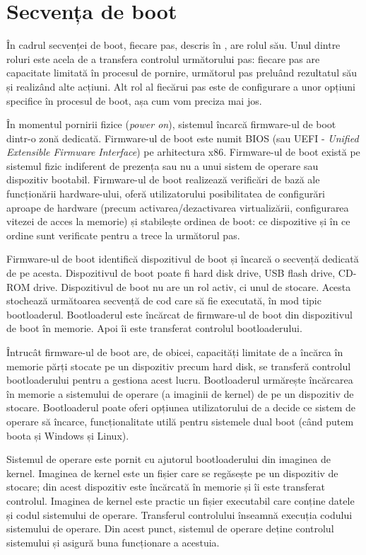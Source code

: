 \section{Secvența de boot}
\label{sec:boot:sequence}

În cadrul secvenței de boot, fiecare pas, descris în , are rolul său.
Unul dintre roluri este acela de a transfera controlul următorului pas: fiecare pas are capacitate limitată în procesul de pornire, următorul pas preluând rezultatul său și realizând alte acțiuni.
Alt rol al fiecărui pas este de configurare a unor opțiuni specifice în procesul de boot, așa cum vom preciza mai jos.

În momentul pornirii fizice (\textit{power on}), sistemul încarcă firmware-ul de boot dintr-o zonă dedicată.
Firmware-ul de boot este numit BIOS (sau UEFI  - \textit{Unified Extensible Firmware Interface}) pe arhitectura x86.
Firmware-ul de boot există pe sistemul fizic indiferent de prezența sau nu a unui sistem de operare sau dispozitiv bootabil.
Firmware-ul de boot realizează verificări de bază ale funcționării hardware-ului, oferă utilizatorului posibilitatea de configurări aproape de hardware (precum activarea/dezactivarea virtualizării, configurarea vitezei de acces la memorie) și stabilește ordinea de boot: ce dispozitive și în ce ordine sunt verificate pentru a trece la următorul pas.

Firmware-ul de boot identifică dispozitivul de boot și încarcă o secvență dedicată de pe acesta.
Dispozitivul de boot poate fi hard disk drive, USB flash drive, CD-ROM drive.
Dispozitivul de boot nu are un rol activ, ci unul de stocare.
Acesta stochează următoarea secvență de cod care să fie executată, în mod tipic bootloaderul.
Bootloaderul este încărcat de firmware-ul de boot din dispozitivul de boot în memorie.
Apoi îi este transferat controlul bootloaderului.

Întrucât firmware-ul de boot are, de obicei, capacități limitate de a încărca în memorie părți stocate pe un dispozitiv precum hard disk, se transferă controlul bootloaderului pentru a gestiona acest lucru.
Bootloaderul urmărește încărcarea în memorie a sistemului de operare (a imaginii de kernel) de pe un dispozitiv de stocare.
 Bootloaderul poate oferi opțiunea utilizatorului de a decide ce sistem de operare să încarce, funcționalitate utilă pentru sistemele dual boot (când putem boota și Windows și Linux).

Sistemul de operare este pornit cu ajutorul bootloaderului din imaginea de kernel.
Imaginea de kernel este un fișier care se regăsește pe un dispozitiv de stocare;
din acest dispozitiv este încărcată în memorie și îi este transferat controlul.
 Imaginea de kernel este practic un fișier executabil care conține datele și codul sistemului de operare.
Transferul controlului înseamnă execuția codului sistemului de operare.
Din acest punct, sistemul de operare deține controlul sistemului și asigură buna funcționare a acestuia.

